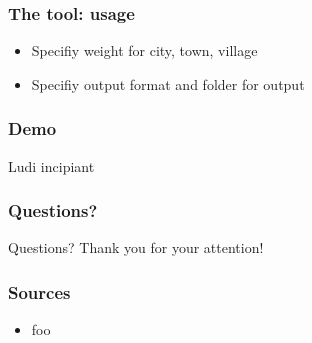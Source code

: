 \documentclass{beamer}
\begin{document}
\begin{frame}
    \frametitle{The tool: usage}
    \begin{itemize}
        \item Specifiy weight for city, town, village
        \item Specifiy output format and folder for output
    \end{itemize}
\end{frame}

\begin{frame}
    \frametitle{Demo}
    \begin{center}
        Ludi incipiant
    \end{center}
\end{frame}

\begin{frame}
    \frametitle{Questions?}
    \begin{center}
    Questions?
    \newline Thank you for your attention!
    \end{center}
\end{frame}

\begin{frame}
    \frametitle{Sources}
    \begin{itemize}
        \item foo
    \end{itemize}
\end{frame}
\end{document}
